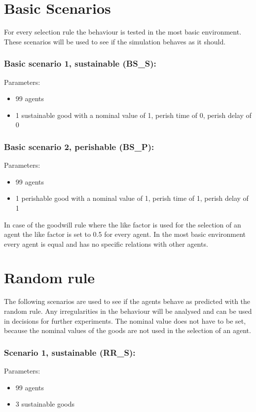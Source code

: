 \documentclass[twoside,openright]{uva-bachelor-thesis}
\begin{document}
\section{Basic Scenarios}
For every selection rule the behaviour is tested in the most basic environment. These scenarios will be used to see if the simulation behaves as it should.
\subsubsection{Basic scenario 1, sustainable (BS\_S):}
Parameters:
\begin{itemize}
\item	99 agents
\item	1 sustainable good with a nominal value of 1, perish time of 0, perish delay of 0
\end{itemize}
\subsubsection{Basic scenario 2, perishable (BS\_P):}
Parameters:
\begin{itemize}
\item	99 agents
\item	1 perishable good with a nominal value of 1, perish time of 1, perish delay of 1
\end{itemize}
In case of the goodwill rule where the like factor is used for the selection of an agent the like factor is set to 0.5 for every agent. In the most basic environment every agent is equal and has no specific relations with other agents.

\section{Random rule}
The following scenarios are  used to see if the agents behave as predicted with the random rule.  Any irregularities in the behaviour will be analysed and can be used in decisions for further experiments. The nominal value does not have to be set, because the nominal values of the goods are not used in the selection of an agent.
\subsubsection{Scenario 1, sustainable (RR\_S):}
Parameters:
\begin{itemize}
\item	99 agents
\item	3 sustainable goods
\end{itemize}
\end{document}
